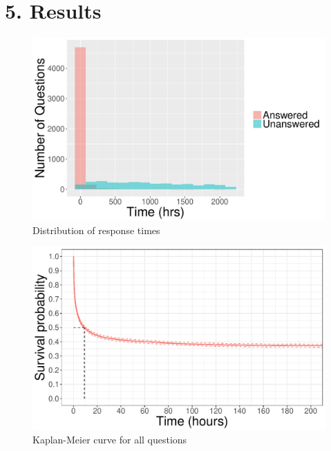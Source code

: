 \documentclass{article}
\begin{document}

\section*{5. Results}


\begin{figure}[!htbp]
  \includegraphics[scale=1]{times_dist.pdf}
  \caption{Distribution of response times}
  \label{fig:answertimes}
\end{figure}

\begin{figure}[!htbp]
  \includegraphics[scale=1]{kmcurve.pdf}
  \caption{Kaplan-Meier curve for all questions}
  \label{fig:kmcurve}
\end{figure}
\end{document}
